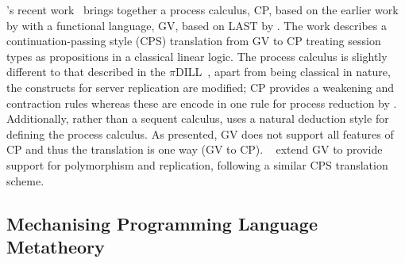 \documentclass{mprop}
\begin{document}
\citeauthor{Wadler:2012}'s recent work~\cite{Wadler:2012} brings together a process calculus, CP, based on the earlier work by \citeauthor{Caires:2010:STI} with a functional language, GV, based on LAST by \citeauthor{Gay:2010:LAST}. The work describes a continuation-passing style (CPS) translation from GV to CP treating session types as propositions in a classical linear logic. The process calculus is slightly different to that described in the $\pi$DILL~\cite{Caires:2010:STI}, apart from being classical in nature, the constructs for server replication are modified; CP provides a weakening and contraction rules whereas these are encode in one rule for process reduction by \citeauthor{Caires:2010:STI}. Additionally, rather than a sequent calculus, \citeauthor{Wadler:2012} uses a natural deduction style for defining the process calculus. As presented, GV does not support all features of CP and thus the translation is one way (GV to CP). \citeauthor{Lindley:2014:SAP}~\cite{Lindley:2014:SAP} extend GV to provide support for polymorphism and replication, following a similar CPS translation scheme.


\subsection{Mechanising Programming Language Metatheory}
\end{document}

